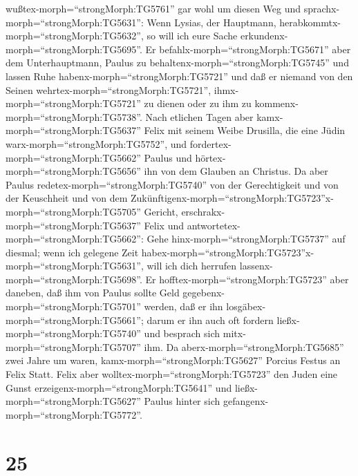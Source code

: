 wußtex-morph=``strongMorph:TG5761'' gar wohl um diesen Weg und
sprachx-morph=``strongMorph:TG5631'': Wenn Lysias, der Hauptmann,
herabkommtx-morph=``strongMorph:TG5632'', so will ich eure Sache
erkundenx-morph=``strongMorph:TG5695''.  Er
befahlx-morph=``strongMorph:TG5671'' aber dem Unterhauptmann, Paulus zu
behaltenx-morph=``strongMorph:TG5745'' und lassen Ruhe
habenx-morph=``strongMorph:TG5721'' und daß er niemand von den Seinen
wehrtex-morph=``strongMorph:TG5721'', ihmx-morph=``strongMorph:TG5721''
zu dienen oder zu ihm zu kommenx-morph=``strongMorph:TG5738''.
 Nach etlichen Tagen aber kamx-morph=``strongMorph:TG5637''
Felix mit seinem Weibe Drusilla, die eine Jüdin
warx-morph=``strongMorph:TG5752'', und
fordertex-morph=``strongMorph:TG5662'' Paulus und
hörtex-morph=``strongMorph:TG5656'' ihn von dem Glauben an Christus.
 Da aber Paulus redetex-morph=``strongMorph:TG5740'' von
der Gerechtigkeit und von der Keuschheit und von dem
Zukünftigenx-morph=``strongMorph:TG5723''x-morph=``strongMorph:TG5705''
Gericht, erschrakx-morph=``strongMorph:TG5637'' Felix und
antwortetex-morph=``strongMorph:TG5662'': Gehe
hinx-morph=``strongMorph:TG5737'' auf diesmal; wenn ich gelegene Zeit
habex-morph=``strongMorph:TG5723''x-morph=``strongMorph:TG5631'', will
ich dich herrufen lassenx-morph=``strongMorph:TG5698''.  Er
hofftex-morph=``strongMorph:TG5723'' aber daneben, daß ihm von Paulus
sollte Geld gegebenx-morph=``strongMorph:TG5701'' werden, daß er ihn
losgäbex-morph=``strongMorph:TG5661''; darum er ihn auch oft fordern
ließx-morph=``strongMorph:TG5740'' und besprach sich
mitx-morph=``strongMorph:TG5707'' ihm.  Da
aberx-morph=``strongMorph:TG5685'' zwei Jahre um waren,
kamx-morph=``strongMorph:TG5627'' Porcius Festus an Felix Statt. Felix
aber wolltex-morph=``strongMorph:TG5723'' den Juden eine Gunst
erzeigenx-morph=``strongMorph:TG5641'' und
ließx-morph=``strongMorph:TG5627'' Paulus hinter sich
gefangenx-morph=``strongMorph:TG5772''.

\hypertarget{section-24}{%
\section{25}\label{section-24}}

